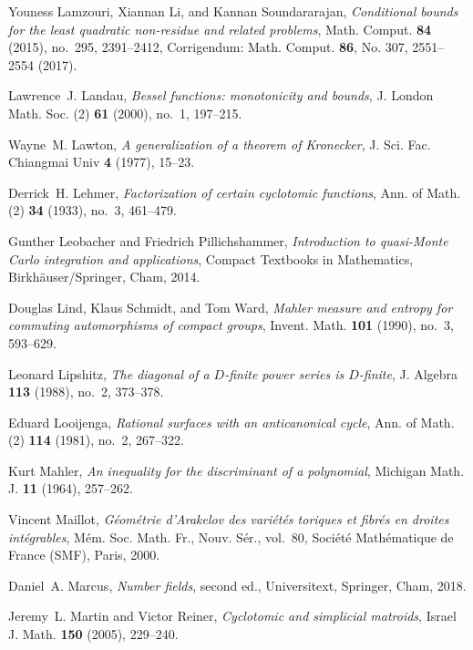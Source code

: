 \documentclass[12pt,reqno]{amsart}
\theoremstyle{definition}
\theoremstyle{plain}
\theoremstyle{definition}
\begin{document}
\begin{thebibliography}{100}
Youness Lamzouri, Xiannan Li, and Kannan Soundararajan, \emph{Conditional
  bounds for the least quadratic non-residue and related problems}, Math.
  Comput. \textbf{84} (2015), no.~295, 2391--2412, Corrigendum: {M}ath.
  {C}omput. \textbf{86}, No. 307, 2551--2554 (2017).

Lawrence~J. Landau, \emph{Bessel functions: monotonicity and bounds}, J. London
  Math. Soc. (2) \textbf{61} (2000), no.~1, 197--215.

Wayne~M. Lawton, \emph{A generalization of a theorem of {K}ronecker}, J. Sci.
  Fac. Chiangmai Univ \textbf{4} (1977), 15--23.

Derrick~H. Lehmer, \emph{Factorization of certain cyclotomic functions}, Ann.
  of Math. (2) \textbf{34} (1933), no.~3, 461--479.

Gunther Leobacher and Friedrich Pillichshammer, \emph{Introduction to
  quasi-{M}onte {C}arlo integration and applications}, Compact Textbooks in
  Mathematics, Birkh\"{a}user/Springer, Cham, 2014.

Douglas Lind, Klaus Schmidt, and Tom Ward, \emph{Mahler measure and entropy for
  commuting automorphisms of compact groups}, Invent. Math. \textbf{101}
  (1990), no.~3, 593--629.

Leonard Lipshitz, \emph{The diagonal of a {$D$}-finite power series is
  {$D$}-finite}, J. Algebra \textbf{113} (1988), no.~2, 373--378.

Eduard Looijenga, \emph{Rational surfaces with an anticanonical cycle}, Ann. of
  Math. (2) \textbf{114} (1981), no.~2, 267--322.

Kurt Mahler, \emph{An inequality for the discriminant of a polynomial},
  Michigan Math. J. \textbf{11} (1964), 257--262.

Vincent Maillot, \emph{G{\'e}om{\'e}trie d'{Arakelov} des vari{\'e}t{\'e}s
  toriques et fibr{\'e}s en droites int{\'e}grables}, M{\'e}m. Soc. Math. Fr.,
  Nouv. S{\'e}r., vol.~80, Soci{\'e}t{\'e} Math{\'e}matique de France (SMF),
  Paris, 2000.

Daniel~A. Marcus, \emph{Number fields}, second ed., Universitext, Springer,
  Cham, 2018.

Jeremy~L. Martin and Victor Reiner, \emph{Cyclotomic and simplicial matroids},
  Israel J. Math. \textbf{150} (2005), 229--240.


\end{thebibliography}
\end{document}

